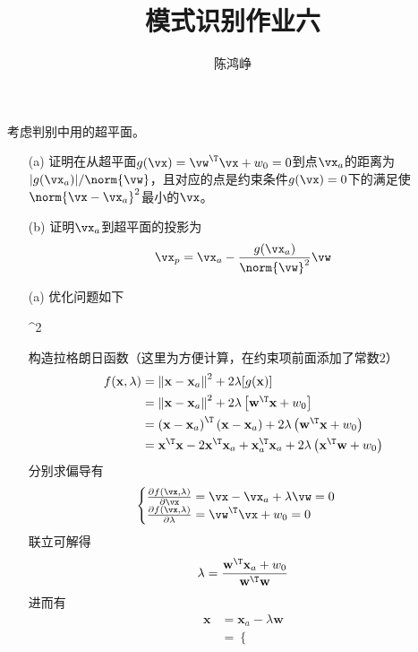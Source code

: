 \documentclass[reportComp]{thesis}
\title{模式识别作业六}
\author{陈鸿峥}
\begin{document}
\maketitle

\begin{question}[\textsection 5 Q4]
考虑判别中用的超平面。
\begin{itemize}
\item [(a)] 证明在从超平面$g(\vx)=\vw^\T \vx+w_0 =0$到点$\vx_a$的距离为$|g(\vx_a)|/\norm{\vw}$，且对应的点是约束条件$g(\vx)=0$下的满足使$\norm{\vx-\vx_a}^2$最小的$\vx$。
\item [(b)] 证明$\vx_a$到超平面的投影为
\[\vx_p=\vx_a-\frac{g(\vx_a)}{\norm{\vw}^2}\vw\]
\end{itemize}
\end{question}
\begin{answer}
\begin{itemize}
	\item [(a)] 优化问题如下
	\begin{mini*}
		{\vx}{^2}{}{}
	\end{mini*}
	构造拉格朗日函数（这里为方便计算，在约束项前面添加了常数$2$）
	\[\begin{aligned}f(\mathbf{x}, \lambda)&=\left\|\mathbf{x}-\mathbf{x}_{a}\right\|^{2}+2 \lambda[g(\mathbf{x})]\\
	&=\left\|\mathbf{x}-\mathbf{x}_{a}\right\|^{2}+2 \lambda\left[\mathbf{w}^\T  \mathbf{x}+w_{0}\right] \\
	&=\left(\mathbf{x}-\mathbf{x}_{a}\right)^\T \left(\mathbf{x}-\mathbf{x}_{a}\right)+2 \lambda\left(\mathbf{w}^\T  \mathbf{x}+w_{0}\right) \\
	&=\mathbf{x}^\T  \mathbf{x}-2 \mathbf{x}^\T  \mathbf{x}_{a}+\mathbf{x}_{a}^\T  \mathbf{x}_{a}+2 \lambda\left(\mathbf{x}^\T  \mathbf{w}+w_{0}\right)
	\end{aligned}\]
	分别求偏导有
	\[\begin{cases}
	{\frac{\partial f(\vx, \lambda)}{\partial \vx}=\vx-\vx_{a}+\lambda \vw=0} \\
	{\frac{\partial f(\vx, \lambda)}{\partial \lambda}=\vw^\T  \vx+w_{0}=0}
	\end{cases}\]
	联立可解得
	\[\lambda=\frac{\mathbf{w}^\T  \mathbf{x}_{a}+w_{0}}{\mathbf{w}^\T  \mathbf{w}}\]
	进而有
	\[\begin{aligned} \mathbf{x} &=\mathbf{x}_{a}-\lambda \mathbf{w} \\
	&=\left\{\begin{array}{ll}

\end{array}
\end{aligned}\]
\end{itemize}
\end{answer}
\end{document}
